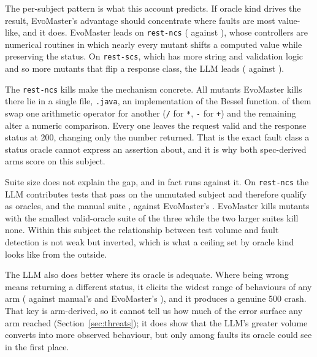 The per-subject pattern is what this account predicts. If oracle kind drives the
result, EvoMaster's advantage should concentrate where faults are most value-like, and it
does. EvoMaster leads on \texttt{rest-ncs} (\RQIINcsEvo{} against \RQIINcsLlm{}), whose
controllers are numerical routines in which nearly every mutant shifts a computed value while
preserving the status. On \texttt{rest-scs}, which has more string and validation logic and so
more mutants that flip a response class, the LLM leads (\RQIIScsLlm{} against \RQIIScsEvo{}).

The \texttt{rest-ncs} kills make the mechanism concrete. All \NcsEvoKills{} mutants EvoMaster
kills there lie in a single file, \texttt{\NcsEvoKillFile.java}, an implementation of the
Bessel function. \NcsEvoKillsArith{} of them swap one arithmetic operator for another
(\texttt{/} for \texttt{*}, \texttt{-} for \texttt{+}) and the remaining \NcsEvoKillsRel{}
alter a numeric comparison. Every one leaves the request valid and the response status at 200,
changing only the number returned. That is the exact fault class a status oracle cannot
express an assertion about, and it is why both spec-derived arms score \RQIINcsLlm{} on this
subject.

Suite size does not explain the gap, and in fact runs against it. On \texttt{rest-ncs} the LLM
contributes \NcsOracleLlm{} tests that pass on the unmutated subject and therefore qualify as
oracles, and the manual suite \NcsOracleManual{}, against EvoMaster's \NcsOracleEvo{}.
EvoMaster kills \NcsEvoKills{} mutants with the smallest valid-oracle suite of the three while
the two larger suites kill none. Within this subject the relationship between test volume and
fault detection is not weak but inverted, which is what a ceiling set by oracle kind looks
like from the outside.

The LLM also does better where its oracle is adequate. Where being wrong means returning a
different status, it elicits the widest range of behaviours of any arm
(\PDerrTriggeredLlm{} against manual's \PDerrTriggeredManual{} and EvoMaster's
\PDerrTriggeredEvo{}), and it produces a genuine 500 crash. That key is arm-derived, so it
cannot tell us how much of the error surface any arm reached
(Section~\ref{sec:threats}); it does show that the LLM's greater volume converts into more
observed behaviour, but only among faults its oracle could see in the first place.

